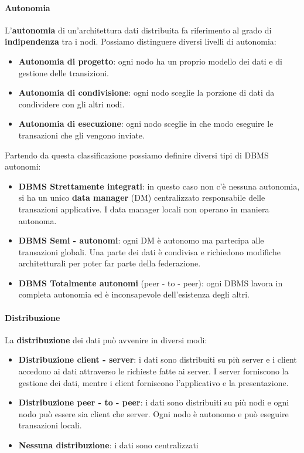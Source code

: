 \paragraph{Autonomia} L'\textbf{autonomia} di un'architettura dati distribuita fa riferimento
al grado di \textbf{indipendenza} tra i nodi. Possiamo distinguere diversi livelli di autonomia:
\begin{itemize}
    \item \textbf{Autonomia di progetto}: ogni nodo ha un proprio modello dei
          dati e di gestione delle transizioni.
    \item \textbf{Autonomia di condivisione}: ogni nodo sceglie la porzione di
          dati da condividere con gli altri nodi.
    \item \textbf{Autonomia di esecuzione}: ogni nodo sceglie in che modo eseguire
          le transazioni che gli vengono inviate.
\end{itemize}
Partendo da questa classificazione possiamo definire diversi tipi di DBMS autonomi:
\begin{itemize}
    \item \textbf{DBMS Strettamente integrati}: in questo caso non c'è nessuna
          autonomia, si ha un unico \textbf{data manager} (DM) centralizzato
          responsabile delle transazioni applicative. I data
          manager locali non operano in maniera autonoma.
    \item \textbf{DBMS Semi - autonomi}: ogni DM è autonomo ma partecipa
          alle transazioni globali. Una parte dei dati è condivisa e richiedono
          modifiche architetturali per poter far parte della federazione.
    \item \textbf{DBMS Totalmente autonomi} (peer - to - peer): ogni DBMS lavora in
          completa autonomia ed è inconsapevole dell'esistenza degli altri.
\end{itemize}

\paragraph{Distribuzione} La \textbf{distribuzione} dei dati può avvenire in diversi
modi:
\begin{itemize}
    \item \textbf{Distribuzione client - server}: i dati sono distribuiti su più server
          e i client accedono ai dati attraverso le richieste fatte ai server.
          I server forniscono la gestione dei dati, mentre i client forniscono
          l'applicativo e la presentazione.
    \item \textbf{Distribuzione peer - to - peer}: i dati sono distribuiti su più nodi
          e ogni nodo può essere sia client che server. Ogni nodo è autonomo
          e può eseguire transazioni locali.
    \item \textbf{Nessuna distribuzione}: i dati sono centralizzati
\end{itemize}

